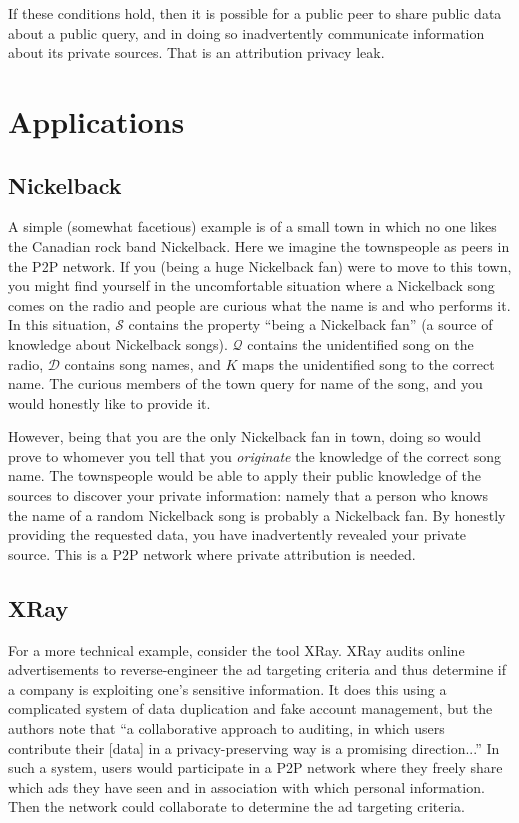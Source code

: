 \documentclass{article}
\begin{document}
If these conditions hold, then it is possible for a public peer to share public
data about a public query, and in doing so inadvertently communicate information
about its private sources. That is an attribution privacy leak.

\section{Applications}\label{sec:example}

\subsection{Nickelback}

A simple (somewhat facetious) example is of a small town in which no one likes
the Canadian rock band Nickelback. Here we imagine the townspeople as peers in
the P2P network. If you (being a huge Nickelback fan) were to move to this town,
you might find yourself in the uncomfortable situation where a Nickelback song
comes on the radio and people are curious what the name is and who performs it.
In this situation, $\mathcal{S}$ contains the property ``being a Nickelback
fan'' (a source of knowledge about Nickelback songs). $\mathcal{Q}$ contains the
unidentified song on the radio, $\mathcal{D}$ contains song names, and $K$ maps
the unidentified song to the correct name. The curious members of the town query
for name of the song, and you would honestly like to provide it.

However, being that you are the only Nickelback fan in town, doing so would
prove to whomever you tell that you {\it originate} the knowledge of the correct
song name. The townspeople would be able to apply their public knowledge of the
sources to discover your private information: namely that a person who knows the
name of a random Nickelback song is probably a Nickelback fan. By honestly
providing the requested data, you have inadvertently revealed your private
source. This is a P2P network where private attribution is needed.

\subsection{XRay}

For a more technical example, consider the tool XRay\cite{xray}. XRay audits
online advertisements to reverse-engineer the ad targeting criteria and thus
determine if a company is exploiting one's sensitive information. It does this
using a complicated system of data duplication and fake account management, but
the authors note that ``a collaborative approach to auditing, in which users
contribute their [data] in a privacy-preserving way is a promising
direction...'' In such a system, users would participate in a P2P network where
they freely share which ads they have seen and in association with which
personal information. Then the network could collaborate to determine the ad
targeting criteria.
\end{document}
